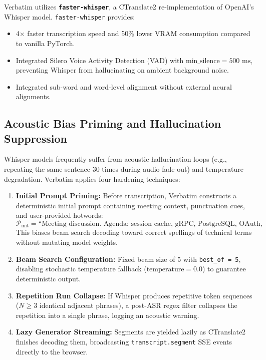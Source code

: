 \documentclass[10pt,a4paper]{article}
\begin{document}
Verbatim utilizes \textbf{\texttt{faster-whisper}}, a CTranslate2 re-implementation of OpenAI's Whisper model. \texttt{faster-whisper} provides:
\begin{itemize}
    \item 4$\times$ faster transcription speed and 50\% lower VRAM consumption compared to vanilla PyTorch.
    \item Integrated Silero Voice Activity Detection (VAD) with $\text{min\_silence} = 500\text{ ms}$, preventing Whisper from hallucinating on ambient background noise.
    \item Integrated sub-word and word-level alignment without external neural alignments.
\end{itemize}

\subsection{Acoustic Bias Priming and Hallucination Suppression}
Whisper models frequently suffer from acoustic hallucination loops (e.g., repeating the same sentence 30 times during audio fade-out) and temperature degradation. Verbatim applies four hardening techniques:
\begin{enumerate}
    \item \textbf{Initial Prompt Priming:} Before transcription, Verbatim constructs a deterministic initial prompt containing meeting context, punctuation cues, and user-provided hotwords:
    \begin{equation}
    \mathcal{P}_{\text{init}} = \text{``Meeting discussion. Agenda: session cache, gRPC, PostgreSQL, OAuth, Terraform, Kafka, Grafana.''}
    \end{equation}
    This biases beam search decoding toward correct spellings of technical terms without mutating model weights.
    \item \textbf{Beam Search Configuration:} Fixed beam size of 5 with \texttt{best\_of = 5}, disabling stochastic temperature fallback ($\text{temperature} = 0.0$) to guarantee deterministic output.
    \item \textbf{Repetition Run Collapse:} If Whisper produces repetitive token sequences ($N \ge 3$ identical adjacent phrases), a post-ASR regex filter collapses the repetition into a single phrase, logging an acoustic warning.
    \item \textbf{Lazy Generator Streaming:} Segments are yielded lazily as CTranslate2 finishes decoding them, broadcasting \texttt{transcript.segment} SSE events directly to the browser.
\end{enumerate}
\end{document}
